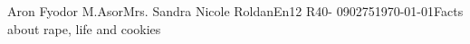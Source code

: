 \documentclass[12pt,letterpaper]{article}
\begin{document}
\begin{mla}{Aron Fyodor M.}{Asor}{Mrs. Sandra Nicole Roldan}{En12 R40- 090275}{\today}{Facts about rape, life and cookies}



\end{mla}
\end{document}
